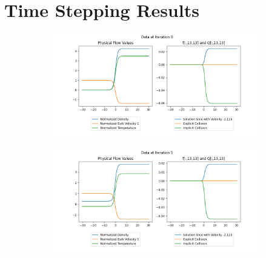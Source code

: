 \documentclass{article}
\begin{document}
\section{Time Stepping Results}
\begin{figure}[H]
  \centering
  \begin{subfigure}[b]{\textwidth}
  \includegraphics[width=\textwidth]{imgs/time_step/output_implicit/0.png}
      \label{fig:image1}
  \end{subfigure}
  \hfill
  \begin{subfigure}[b]{\textwidth}
  \includegraphics[width=\textwidth]{imgs/time_step/output_implicit/5.png}
      \label{fig:image2}
  \end{subfigure}
\end{figure}
  
\end{document}
